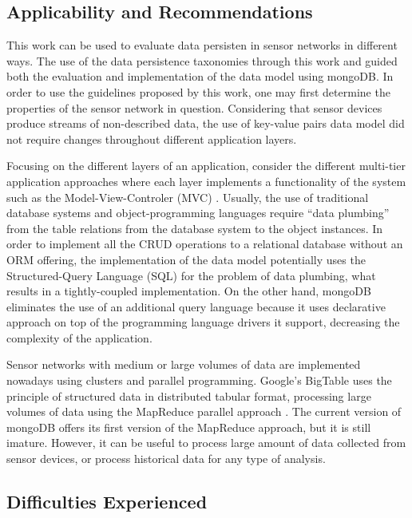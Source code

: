 \subsection{Applicability and Recommendations}

This work can be used to evaluate data persisten in sensor networks in
different ways. The use of the data persistence taxonomies through this work
and guided both the evaluation and implementation of the data model using
mongoDB. In order to use the guidelines proposed by this work, one may first
determine the properties of the sensor network in question. Considering that
sensor devices produce streams of non-described data, the use of key-value
pairs data model did not require changes throughout different application
layers.

Focusing on the different layers of an application, consider the different
multi-tier application approaches where each layer implements a functionality
of the system such as the Model-View-Controler (MVC) \cite{sw-architectures}.
Usually, the use of traditional database systems and object-programming 
languages require ``data plumbing'' from the table relations from
the database system to the object instances. In order to implement all the
CRUD operations to a relational database without an ORM \cite{orm} offering,
the implementation of the data model potentially uses the Structured-Query
Language (SQL) for the problem of data plumbing, what results in a
tightly-coupled implementation. On the other hand, mongoDB eliminates the use
of an additional query language because it uses declarative approach on top of
the programming language drivers it support, decreasing the complexity of the
application.

Sensor networks with medium or large volumes of data are implemented nowadays
using clusters and parallel programming. Google's BigTable \cite{bigtable} uses
the principle of structured data in distributed tabular format, processing large
volumes of data using the MapReduce parallel approach \cite{map-reduce}. The
current version of mongoDB offers its first version of the MapReduce approach,
but it is still imature. However, it can be useful to process large amount of
data collected from sensor devices, or process historical data for any type of
analysis.

\subsection{Difficulties Experienced}
\label{sec:experiments-difficulties}

